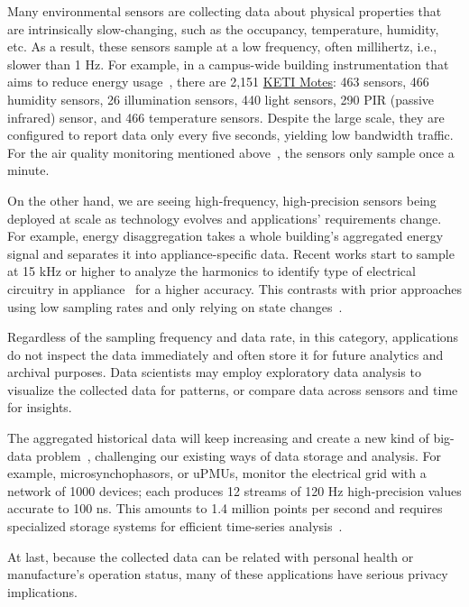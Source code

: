 Many environmental sensors are collecting data about physical properties that
are intrinsically slow-changing, such as the occupancy, temperature, humidity,
etc. As a result, these sensors sample at a low frequency, often millihertz,
i.e., slower than 1 Hz. For example, in a campus-wide building instrumentation
that aims to reduce energy usage~\cite{krioukov2012building}, there are 2,151
\href{http://www.keti.re.kr/}{KETI Motes}: 463  sensors, 466 humidity
sensors, 26 illumination sensors, 440 light sensors, 290 PIR (passive infrared)
sensor, and 466 temperature sensors. Despite the large scale, they are
configured to report data only every five seconds, yielding low bandwidth
traffic. For the air quality monitoring mentioned
above~\cite{cheng2014aircloud}, the sensors only sample once a minute.

On the other hand, we are seeing high-frequency, high-precision sensors being
deployed at scale as technology evolves and applications' requirements
change. For example, energy disaggregation takes a whole building's aggregated
energy signal and separates it into appliance-specific data. Recent works start
to sample at 15 kHz or higher to analyze the harmonics to identify type of
electrical circuitry in appliance~\cite{kolter2011redd} for a higher
accuracy. This contrasts with prior approaches using low sampling rates and only
relying on state changes~\cite{hart1992nonintrusive}.

Regardless of the sampling frequency and data rate, in this category,
applications do not inspect the data immediately and often store it for future
analytics and archival purposes. Data scientists may employ exploratory data
analysis to visualize the collected data for patterns, or compare data across
sensors and time for insights.

The aggregated historical data will keep increasing and create a new kind of
big-data problem~\cite{diaz2012big, zaslavsky2013sensing}, challenging our
existing ways of data storage and analysis. For example, microsynchophasors, or
uPMUs, monitor the electrical grid with a network of 1000 devices; each produces
12 streams of 120 Hz high-precision values accurate to 100 ns. This amounts to
1.4 million points per second and requires specialized storage systems for
efficient time-series analysis~\cite{andersen2016btrdb}.

At last, because the collected data can be related with personal health or
manufacture's operation status, many of these applications have serious privacy
implications.

